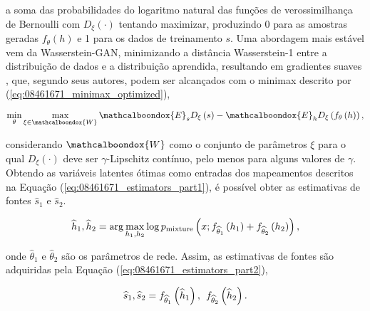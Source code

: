 \noindent a soma das probabilidades do logaritmo natural das funções de verossimilhança de Bernoulli com $D_ {\xi}\left(\cdot\right)$ tentando maximizar, produzindo 0 para as amostras geradas $f_{\theta}\left(h\right)$ e 1 para os dados de treinamento $s$. Uma abordagem mais estável vem da Wasserstein-GAN, minimizando a distância Wasserstein-1 \citep{OLKIN1982257} entre a distribuição de dados e a distribuição aprendida, resultando em gradientes suaves \citep{arjovsky2017wasserstein}, que, segundo seus autores, podem ser alcançados com o minimax descrito por (\ref{eq:08461671_minimax_optimized}),

\begin{equation}
    \min_{\theta}\max_{\xi\in\mathcalboondox{W}}\mathcalboondox{E}_{s}D_{\xi}\left(s\right) - \mathcalboondox{E}_{h}D_{\xi}\left(f_{\theta}\left(h\right)\right),
    \label{eq:08461671_minimax_optimized}
    \vspace{0.2cm}
\end{equation}


\noindent considerando $\mathcalboondox{W}$ como o conjunto de parâmetros $\xi$ para o qual $D_{\xi}\left(\cdot\right)$ deve ser $\gamma$-Lipschitz contínuo, pelo menos para alguns valores de $\gamma$. Obtendo as variáveis latentes ótimas como entradas dos mapeamentos
 descritos na Equação (\ref{eq:08461671_estimators_part1}), é possível obter as estimativas de fontes $\widehat{s}_{1}$ e $\widehat{s}_{2}$.

\begin{equation}
    \widehat{h}_{1}, \widehat{h}_{2} = \arg \max_{h_{1}, h_{2}} \log p_{\text{mixture}}\left(x; f_{\widehat{\theta}_{1}}\left(h_{1}\right)+f_{\widehat{\theta}_{2}}\left(h_{2}\right)\right),
    \label{eq:08461671_estimators_part1}
    \vspace{0.2cm}
\end{equation}

\noindent onde $\widehat{\theta}_{1}$ e $\widehat{\theta}_{2}$ são os parâmetros de rede. Assim, as estimativas de fontes são adquiridas pela Equação (\ref{eq:08461671_estimators_part2}),

\begin{equation}
    \widehat{s}_{1}, \widehat{s}_{2} = f_{\widehat{\theta}_{1}}\left(\widehat{h}_{1}\right),\hspace{0.15cm} f_{\widehat{\theta}_{2}}\left(\widehat{h}_{2}\right).
    \label{eq:08461671_estimators_part2}
    \vspace{0.2cm}
\end{equation}

